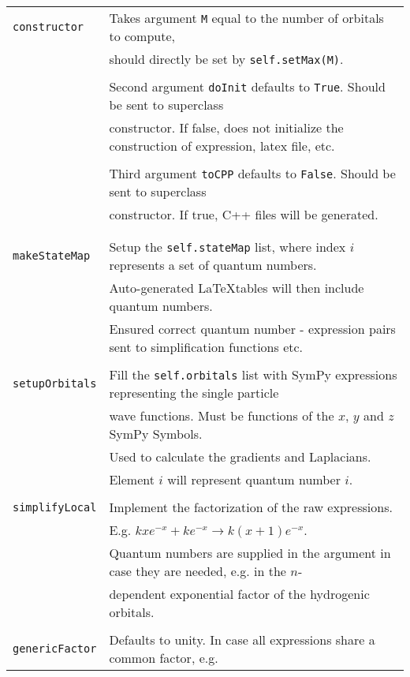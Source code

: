 \begin{small}
\begin{tabular}{ll}
\verb+constructor+	& Takes argument \verb+M+ equal to the number of orbitals to compute,\\
			& should directly be set by \verb+self.setMax(M)+.\\
			&\\
			& Second argument \verb+doInit+ defaults to \verb+True+. Should be sent to superclass \\
			& constructor. If false, does not initialize the construction of expression, latex file, etc.\\
			&\\
			& Third argument \verb+toCPP+ defaults to \verb+False+. Should be sent to superclass \\
			& constructor. If true, C++ files will be generated. \\
			&\\
			&\\
\verb+makeStateMap+	& Setup the \verb+self.stateMap+ list, where index $i$ represents a set of quantum numbers. \\
			& Auto-generated \LaTeX tables will then include quantum numbers. \\
			& Ensured correct quantum number - expression pairs sent to simplification functions etc. \\
			& \\
\verb+setupOrbitals+	& Fill the \verb+self.orbitals+ list with SymPy expressions representing the single particle \\
			& wave functions. Must be functions of the $x$, $y$ and $z$ SymPy Symbols. \\
			& Used to calculate the gradients and Laplacians. \\
			& Element $i$ will represent quantum number $i$. \\
			&\\
\verb+simplifyLocal+	& Implement the factorization of the raw expressions. \\
			& E.g. $kxe^{-x} + ke^{-x} \to k(x + 1)e^{-x}$. \\
			& Quantum numbers are supplied in the argument in case they are needed, e.g. in the $n$- \\ 
			& dependent exponential factor of the hydrogenic orbitals. \\
			&\\
\verb+genericFactor+	& Defaults to unity. In case all expressions share a common factor, e.g. \\

\end{tabular}
\end{small}
